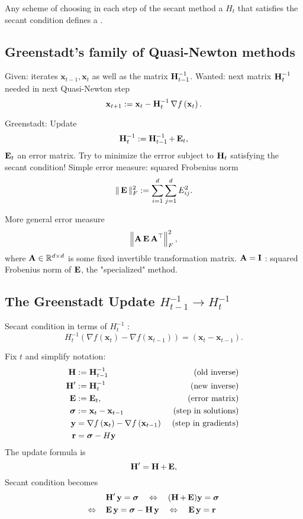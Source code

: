 Any scheme of choosing in each step of the secant method a  $H_{t}$ that satisfies the secant condition defines a .





\subsection*{Greenstadt's family of Quasi-Newton methods}
Given: iterates $\mathbf{x}_{t-1}, \mathbf{x}_{t}$ as well as the matrix $\H_{t-1}^{-1}$.
Wanted: next matrix $\H_{t}^{-1}$ needed in next Quasi-Newton step
$$
\mathbf{x}_{t+1}:=\mathbf{x}_{t}-\H_{t}^{-1} \nabla f\left(\mathbf{x}_{t}\right) .
$$

Greenstadt: Update
$$
\H_{t}^{-1}:=\H_{t-1}^{-1}+\mE_{t},
$$
$\mE_{t}$ an error matrix.
Try to minimize the errror subject to $\H_{t}$ satisfying the secant condition!
Simple error measure: squared Frobenius norm
$$
\|\mE\|_{F}^{2}:=\sum_{i=1}^{d} \sum_{j=1}^{d} E_{i j}^{2} .
$$

More general error measure
$$
\left\|\A \mE \A^{\top}\right\|_{F}^{2},
$$
where $\A \in \mathbb{R}^{d \times d}$ is some fixed invertible transformation matrix. 
$\A=\I$ : squared Frobenius norm of $\mE$, the "specialized" method.





\subsection*{The Greenstadt Update $H_{t-1}^{-1} \rightarrow H_{t}^{-1}$}
Secant condition in terms of $H_{t}^{-1}$ :
$$
H_{t}^{-1}\left(\nabla f\left(\mathbf{x}_{t}\right)-\nabla f\left(\mathbf{x}_{t-1}\right)\right)=\left(\mathbf{x}_{t}-\mathbf{x}_{t-1}\right) .
$$

Fix $t$ and simplify notation:
$$\begin{aligned}\H &:=\H_{t-1}^{-1} &  \text { (old inverse) } \\ \H^{\prime} &:=\H_{t}^{-1} &  \text { (new inverse) } \\ \mE &:=\mE_{t}, & \text { (error matrix) } \\ \boldsymbol{\sigma} &:=\mathbf{x}_{t}-\mathbf{x}_{t-1} & \text { (step in solutions) } \\ \mathbf{y} &=\nabla f\left(\mathbf{x}_{t}\right)-\nabla f\left(\mathbf{x}_{t-1}\right) & \text { (step in gradients) } \\ \mathbf{r} &=\boldsymbol{\sigma}-H \mathbf{y} \end{aligned}$$
The update formula is
$$
\H^{\prime}=\H+\mE,
$$
Secant condition becomes
$$
\begin{aligned}
&\H^{\prime} \mathbf{y}=\boldsymbol{\sigma} \quad \Leftrightarrow \quad(\H+\mE) \mathbf{y}=\boldsymbol{\sigma} \\
\Leftrightarrow \quad &\mE \mathbf{y}=\boldsymbol{\sigma}-\H \mathbf{y} \quad \Leftrightarrow \quad \mE \mathbf{y}=\mathbf{r}
\end{aligned}
$$



